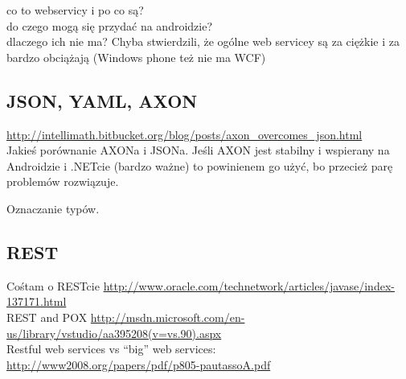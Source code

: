 co to webservicy i po co są?\\
do czego mogą się przydać na androidzie?\\
dlaczego ich nie ma? Chyba stwierdzili, że ogólne web servicey są za ciężkie i za bardzo obciążają (Windows phone też nie ma WCF)\\

\subsection{JSON, YAML, AXON}
\url{http://intellimath.bitbucket.org/blog/posts/axon_overcomes_json.html}\\
Jakieś porównanie AXONa i JSONa. Jeśli AXON jest stabilny i wspierany na Androidzie i .NETcie (bardzo ważne) to powinienem go użyć, bo przecież parę problemów rozwiązuje.

Oznaczanie typów.

\subsection{REST}
Cośtam o RESTcie \url{http://www.oracle.com/technetwork/articles/javase/index-137171.html}\\
REST and POX \url{http://msdn.microsoft.com/en-us/library/vstudio/aa395208(v=vs.90).aspx}\\

Restful web services vs ``big'' web services: \url{http://www2008.org/papers/pdf/p805-pautassoA.pdf}\\